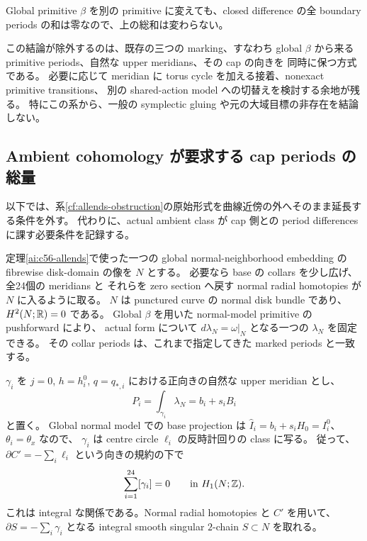 Global primitive $\beta$ を別の primitive に変えても、closed difference の全 boundary periods の和は零なので、上の総和は変わらない。

この結論が除外するのは、既存の三つの marking、すなわち
global $\beta$ から来る primitive periods、自然な upper meridians、その cap の向きを
同時に保つ方式である。
必要に応じて meridian に torus cycle を加える接着、nonexact primitive transitions、
別の shared-action model への切替えを検討する余地が残る。
特にこの系から、一般の symplectic gluing や元の大域目標の非存在を結論しない。

\subsection{Ambient cohomology が要求する cap periods の総量}

以下では、系\ref{cf:allends-obstruction}の原始形式を曲線近傍の外へそのまま延長する条件を外す。
代わりに、actual ambient class が cap 側との period differences に課す必要条件を記録する。

定理\ref{ai:c56-allends}で使った一つの global normal-neighborhood embedding の
fibrewise disk-domain の像を $N$ とする。
必要なら base の collars を少し広げ、全24個の meridians と
それらを zero section へ戻す normal radial homotopies が $N$ に入るように取る。
$N$ は punctured curve の normal disk bundle であり、$H^2(N;\mathbb R)=0$ である。
Global $\beta$ を用いた normal-model primitive の pushforward により、
actual form について $d\lambda_N=\omega|_N$ となる一つの $\lambda_N$ を固定できる。
その collar periods は、これまで指定してきた marked periods と一致する。

$\gamma_i$ を $j=0$, $h=h_i^0$, $q=q_{*,i}$ における正向きの自然な upper meridian とし、
\[
 P_i=\int_{\gamma_i}\lambda_N=b_i+s_iB_i
\]
と置く。
Global normal model での base projection は
$\widehat I_i=b_i+s_iH_0=I_i^0$、$\theta_i=\theta_x$ なので、
$\gamma_i$ は centre circle $\ell_i$ の反時計回りの class に写る。
従って、$\partial C'=-\sum_i\ell_i$ という向きの規約の下で
\[
 \sum_{i=1}^{24}[\gamma_i]=0\qquad\text{in }H_1(N;\mathbb Z).
\]
これは integral な関係である。Normal radial homotopies と $C'$ を用いて、
$\partial S=-\sum_i\gamma_i$ となる integral smooth singular $2$-chain $S\subset N$ を取れる。

